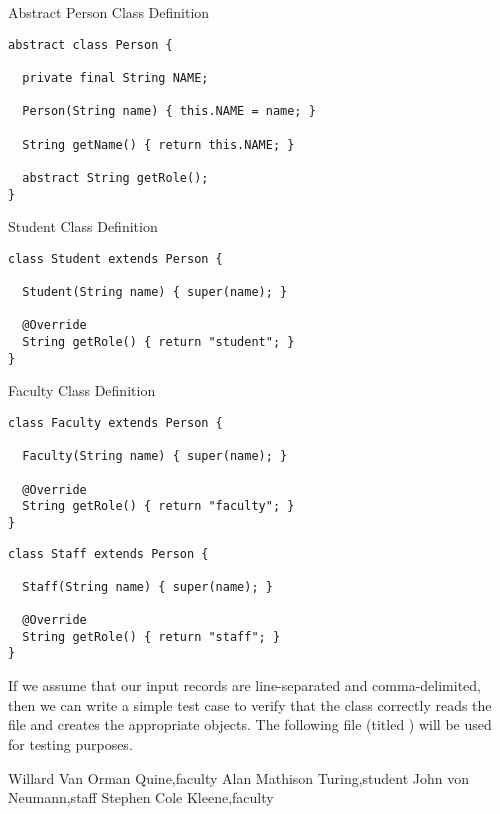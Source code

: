 \begin{cl}{Abstract Person Class Definition}
\begin{lstlisting}[language=MyJava]
abstract class Person {

  private final String NAME;

  Person(String name) { this.NAME = name; }

  String getName() { return this.NAME; }

  abstract String getRole();
}
\end{lstlisting}
\end{cl}

\begin{cl}{Student Class Definition}
\begin{lstlisting}[language=MyJava]
class Student extends Person {

  Student(String name) { super(name); }

  @Override
  String getRole() { return "student"; }
}
\end{lstlisting}
\end{cl}

\begin{cl}{Faculty Class Definition}
\begin{lstlisting}[language=MyJava]
class Faculty extends Person {

  Faculty(String name) { super(name); }

  @Override
  String getRole() { return "faculty"; }
}
\end{lstlisting}
\end{cl}

\begin{cl}{}
\begin{lstlisting}[language=MyJava]
class Staff extends Person {

  Staff(String name) { super(name); }

  @Override
  String getRole() { return "staff"; }
}
\end{lstlisting}
\end{cl}

If we assume that our input records are line-separated and comma-delimited, then we can write a simple test case to verify that the  class correctly reads the file and creates the appropriate  objects. The following file (titled ) will be used for testing purposes.

\begin{verbnobox}[\small]
Willard Van Orman Quine,faculty
Alan Mathison Turing,student
John von Neumann,staff
Stephen Cole Kleene,faculty
\end{verbnobox}

